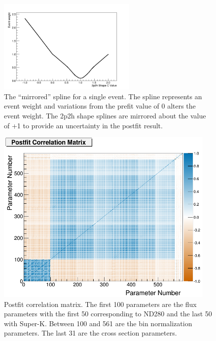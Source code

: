 \begin{figure}
\begin{centering}
\includegraphics[width=0.6\textwidth]{Chapters/Figures/FitterResults/2p2hShapeCSpline}
\par\end{centering}
\caption[The 2p2h Shape Mirrored Spline]{The ``mirrored'' spline for a single event. The spline represents
an event weight and variations from the prefit value of 0 alters the
event weight. The 2p2h shape splines are mirrored about the value
of +1 to provide an uncertainty in the postfit result.\label{fig:The-mirrored-spline}}
\end{figure}

\begin{figure}
\begin{centering}
\includegraphics[width=0.95\textwidth]{Chapters/Figures/FitterResults/Postfit/covariance/corr_post}
\par\end{centering}
\caption[Postfit Correlation Matrix]{Postfit correlation matrix. The first 100 parameters are the flux
parameters with the first 50 corresponding to ND280 and the last 50
with Super-K. Between 100 and 561 are the bin normalization parameters.
The last 31 are the cross section parameters.\label{fig:Postfit-correlation-matrix}}
\end{figure}

